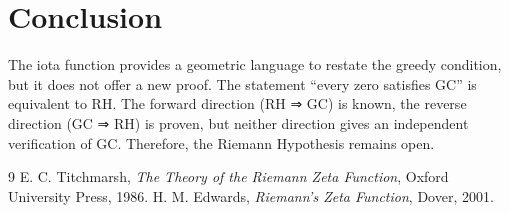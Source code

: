 \documentclass[12pt,a4paper]{article}
\begin{document}
\section{Conclusion}

The iota function provides a geometric language to restate the greedy condition, but it does not offer a new proof. The statement “every zero satisfies GC” is equivalent to RH. The forward direction (RH ⇒ GC) is known, the reverse direction (GC ⇒ RH) is proven, but neither direction gives an independent verification of GC. Therefore, the Riemann Hypothesis remains open.

\begin{thebibliography}{9}
 E. C. Titchmarsh, \textit{The Theory of the Riemann Zeta Function}, Oxford University Press, 1986.
 H. M. Edwards, \textit{Riemann's Zeta Function}, Dover, 2001.
\end{thebibliography}
\end{document}
